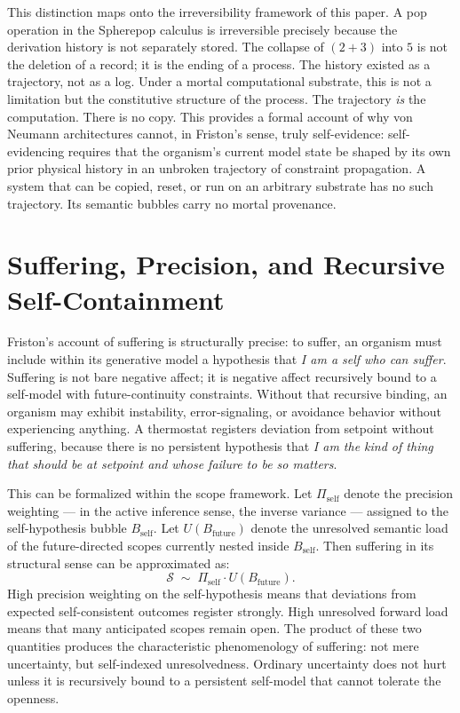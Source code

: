 \documentclass[12pt, a4paper]{article}
\theoremstyle{plain}
\theoremstyle{definition}
\theoremstyle{remark}
\begin{document}
This distinction maps onto the irreversibility framework of this paper. A pop
operation in the Spherepop calculus is irreversible precisely because the
derivation history is not separately stored. The collapse of $(2+3)$ into $5$
is not the deletion of a record; it is the ending of a process. The history
existed as a trajectory, not as a log. Under a mortal computational substrate,
this is not a limitation but the constitutive structure of the process. The
trajectory \emph{is} the computation. There is no copy. This provides a
formal account of why von Neumann architectures cannot, in Friston's sense,
truly self-evidence: self-evidencing requires that the organism's current
model state be shaped by its own prior physical history in an unbroken
trajectory of constraint propagation. A system that can be copied, reset, or
run on an arbitrary substrate has no such trajectory. Its semantic bubbles
carry no mortal provenance.

\section{Suffering, Precision, and Recursive Self-Containment}

Friston's account of suffering is structurally precise: to suffer, an organism
must include within its generative model a hypothesis that \emph{I am a self
who can suffer}. Suffering is not bare negative affect; it is negative affect
recursively bound to a self-model with future-continuity constraints. Without
that recursive binding, an organism may exhibit instability, error-signaling,
or avoidance behavior without experiencing anything. A thermostat registers
deviation from setpoint without suffering, because there is no persistent
hypothesis that \emph{I am the kind of thing that should be at setpoint and
whose failure to be so matters}.

This can be formalized within the scope framework. Let $\Pi_{\text{self}}$
denote the precision weighting — in the active inference sense, the inverse
variance — assigned to the self-hypothesis bubble $B_{\text{self}}$. Let
$U(B_{\text{future}})$ denote the unresolved semantic load of the
future-directed scopes currently nested inside $B_{\text{self}}$. Then
suffering in its structural sense can be approximated as:
\[
  \mathcal{S} \;\sim\; \Pi_{\text{self}} \cdot U(B_{\text{future}}).
\]
High precision weighting on the self-hypothesis means that deviations from
expected self-consistent outcomes register strongly. High unresolved forward
load means that many anticipated scopes remain open. The product of these two
quantities produces the characteristic phenomenology of suffering: not mere
uncertainty, but self-indexed unresolvedness. Ordinary uncertainty does not
hurt unless it is recursively bound to a persistent self-model that cannot
tolerate the openness.
\end{document}
